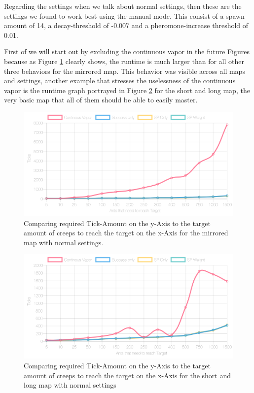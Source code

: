 Regarding the settings when we talk about normal settings, then these are the settings we found to work best using the manual mode. This consist of a spawn-amount of 14, a decay-threshold of -0.007 and a pheromone-increase threshold of 0.01.

First of we will start out by excluding the continuous vapor in the future Figures because as Figure \ref{fig:mirrorvaptick} clearly shows, the runtime is much larger than for all other three behaviors for the mirrored map. This behavior was visible across all maps and settings, another example that stresses the uselessness of the continuous vapor is the runtime graph portrayed in Figure \ref{fig:shortlongvaptick} for the short and long map, the very basic map that all of them should be able to easily master.

\begin{figure}[H]
  \centering
  \includegraphics[width=1\linewidth]{images/normalmirroredwithtower-ticks-line}
  \caption{Comparing required Tick-Amount on the y-Axis to the target amount of creeps to reach the target on the x-Axis for the mirrored map with normal settings.}
  \label{fig:mirrorvaptick}
\end{figure}

\begin{figure}[H]
  \centering
  \includegraphics[width=1\linewidth]{images/normalshortandlongwithtowers-ticks-line}
  \caption{Comparing required Tick-Amount on the y-Axis to the target amount of creeps to reach the target on the x-Axis for the short and long map with normal settings}
  \label{fig:shortlongvaptick}
\end{figure}

